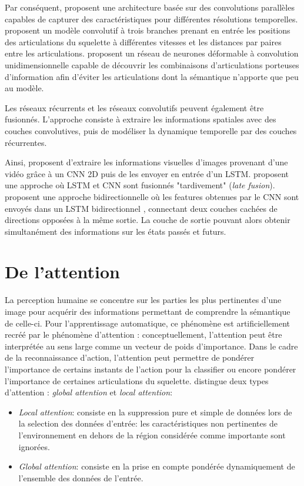 Par conséquent, \cite{devineau2018deep} proposent une architecture basée sur des convolutions parallèles capables de capturer des caractéristiques pour différentes résolutions temporelles.
\cite{2019arXiv190709658Y} proposent un modèle convolutif à trois branches prenant en entrée les positions des articulations du squelette à différentes vitesses et les distances par paires entre les articulations.
\cite{weng2018deformable} proposent un réseau de neurones déformable à convolution unidimensionnelle capable de découvrir les combinaisons d'articulations porteuses d'information afin d'éviter les articulations dont la sémantique n'apporte que peu au modèle.



Les réseaux récurrents et les réseaux convolutifs peuvent également être fusionnés. L'approche consiste à extraire les informations spatiales avec des couches convolutives, puis de modéliser la dynamique temporelle par des couches récurrentes.

Ainsi, \cite{donahue2015long} proposent d'extraire les informations visuelles d'images provenant d'une vidéo grâce à un CNN 2D puis de les envoyer en entrée d'un LSTM.
\cite{li2017skeleton} proposent une approche où LSTM et CNN sont fusionnés "tardivement" (\textit{late fusion}). \cite{ullah2017action} proposent une approche bidirectionnelle où les features obtenues par le CNN sont envoyés dans un LSTM bidirectionnel \cite{Schuster97bidirectionalrecurrent}, connectant deux couches cachées de directions opposées à la même sortie. La couche de sortie pouvant alors obtenir simultanément des informations sur les états passés et futurs.

\section{De l'attention}
La perception humaine se concentre sur les parties les plus pertinentes d'une image pour acquérir des informations permettant de comprendre la sémantique de celle-ci. Pour l'apprentissage automatique, ce phénomène est artificiellement recréé par le phénomène d'attention \cite{bahdanau2014neural,2017arXiv170603762V}: conceptuellement, l'attention peut être interprétée au sens large comme un vecteur de poids d'importance. 
Dans le cadre de la reconnaissance d'action, l'attention peut permettre de pondérer l'importance de certains instants de l'action pour la classifier ou encore pondérer l'importance de certaines articulations du squelette.
\cite{luong2015effective} distingue deux types d’attention : \textit{global attention} et \textit{local attention}:
 \begin{itemize}
     \item \textit{Local attention}: consiste en la suppression pure et simple de données lors de la selection des données d'entrée: les caractéristiques non pertinentes de l'environnement en dehors de la région considérée comme importante sont ignorées.
     \item \textit{Global attention}: consiste en la prise en compte pondérée dynamiquement de l'ensemble des données de l'entrée.
 \end{itemize}
 

